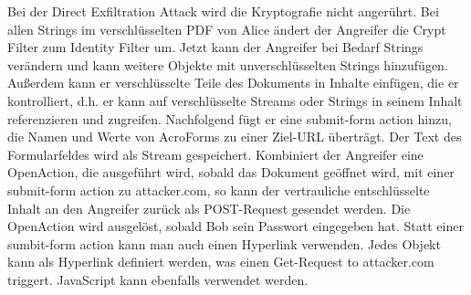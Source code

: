 Bei der Direct Exfiltration Attack wird die Kryptografie nicht angerührt. Bei allen Strings im verschlüsselten PDF von Alice ändert der Angreifer die Crypt Filter zum Identity Filter um. Jetzt kann der Angreifer bei Bedarf Strings verändern und kann weitere Objekte mit unverschlüsselten Strings hinzufügen. Außerdem kann er verschlüsselte Teile des Dokuments in Inhalte einfügen, die er kontrolliert, d.h. er kann auf verschlüsselte Streams oder Strings in seinem Inhalt referenzieren und zugreifen. Nachfolgend fügt er eine submit-form action hinzu, die Namen und Werte von AcroForms zu einer Ziel-URL überträgt. Der Text des Formularfeldes wird als Stream gespeichert. Kombiniert der Angreifer eine OpenAction, die ausgeführt wird, sobald das Dokument geöffnet wird, mit einer submit-form action zu attacker.com, so kann der vertrauliche entschlüsselte Inhalt an den Angreifer zurück als POST-Request gesendet werden. Die OpenAction wird ausgelöst, sobald Bob sein Passwort eingegeben hat. Statt einer sumbit-form action kann man auch einen Hyperlink verwenden. Jedes Objekt kann als Hyperlink definiert werden, was einen Get-Request to attacker.com triggert. JavaScript kann ebenfalls verwendet werden. \cite{ccc-break-pdf, pdfex}
\par
